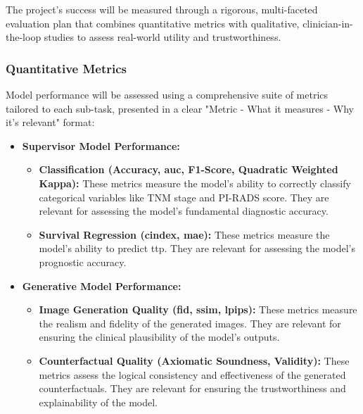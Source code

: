 \documentclass[11pt, a4paper]{article}
\begin{document}
The project's success will be measured through a rigorous, multi-faceted evaluation plan that combines quantitative metrics with qualitative, clinician-in-the-loop studies to assess real-world utility and trustworthiness.

\subsubsection{Quantitative Metrics}
Model performance will be assessed using a comprehensive suite of metrics tailored to each sub-task, presented in a clear "Metric - What it measures - Why it's relevant" format:
\begin{itemize}
    \item \textbf{Supervisor Model Performance:}
        \begin{itemize}
            \item \textbf{Classification (Accuracy, \gls{auc}, F1-Score, Quadratic Weighted Kappa):} These metrics measure the model's ability to correctly classify categorical variables like TNM stage and PI-RADS score. They are relevant for assessing the model's fundamental diagnostic accuracy.
            \item \textbf{Survival Regression (\gls{cindex}, \gls{mae}):} These metrics measure the model's ability to predict \gls{ttp}. They are relevant for assessing the model's prognostic accuracy.
        \end{itemize}
    \item \textbf{Generative Model Performance:}
        \begin{itemize}
            \item \textbf{Image Generation Quality (\gls{fid}, \gls{ssim}, \gls{lpips}):} These metrics measure the realism and fidelity of the generated images. They are relevant for ensuring the clinical plausibility of the model's outputs.
            \item \textbf{Counterfactual Quality (Axiomatic Soundness, Validity):} These metrics assess the logical consistency and effectiveness of the generated counterfactuals. They are relevant for ensuring the trustworthiness and explainability of the model.
        \end{itemize}
\end{itemize}
\end{document}
